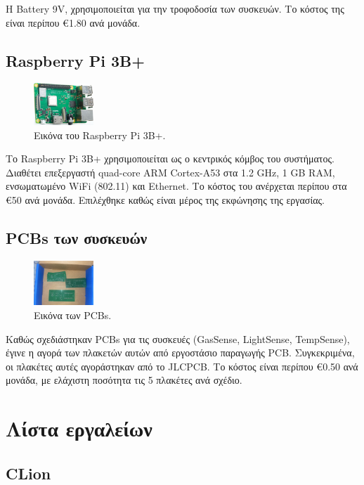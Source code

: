 \documentclass[conference]{IEEEtran}
\begin{document}
Η Battery 9V, χρησιμοποιείται για την τροφοδοσία των συσκευών. Το κόστος της είναι περίπου €1.80 ανά μονάδα. \cite{bv9}

\subsection{Raspberry Pi 3B+}

\begin{figure}[H]
	\centerline{\includegraphics[width=0.2\textwidth]{assets/rpi3}}
	\caption{Εικόνα του Raspberry Pi 3B+.}
	\label{Εικόνα του Raspberry Pi 3B+}
\end{figure}

Το Raspberry Pi 3B+ χρησιμοποιείται ως ο κεντρικός κόμβος του συστήματος. Διαθέτει επεξεργαστή quad-core ARM Cortex-A53 στα 1.2 GHz, 1 GB RAM, ενσωματωμένο WiFi (802.11) και Ethernet. Το κόστος του ανέρχεται περίπου στα €50 ανά μονάδα. \cite{rpi3b} Επιλέχθηκε καθώς είναι μέρος της εκφώνησης της εργασίας.

\subsection{PCBs των συσκευών}

\begin{figure}[H]
	\centerline{\includegraphics[width=0.2\textwidth]{assets/pcbs}}
	\caption{Εικόνα των PCBs.}
	\label{Εικόνα των PCBs}
\end{figure}

Καθώς σχεδιάστηκαν PCBs για τις συσκευές (GasSense, LightSense, TempSense), έγινε η αγορά των πλακετών αυτών από εργοστάσιο παραγωγής PCB. Συγκεκριμένα, οι πλακέτες αυτές αγοράστηκαν από το JLCPCB. Το κόστος είναι περίπου €0.50 ανά μονάδα, με ελάχιστη ποσότητα τις 5 πλακέτες ανά σχέδιο.

\section{Λίστα εργαλείων}

\subsection{CLion}
\end{document}
